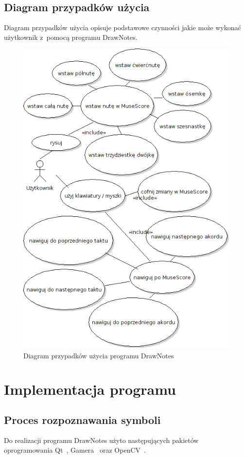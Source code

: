 \documentclass[polish,thesis,12pt]{dcsbook}
\begin{document}
\newpage
\section{Diagram przypadków użycia}
Diagram przypadków użycia opisuje podstawowe czynności jakie może wykonać użytkownik z~pomocą programu DrawNotes.
\begin{figure}[H]
  \centering
  \includegraphics[scale=0.75,bb=0 0 505 735]{img/UC.png}
  \caption{Diagram przypadków użycia programu DrawNotes}
  \label{uc}
\end{figure}

\chapter{Implementacja programu}
\section{Proces rozpoznawania symboli}
Do realizacji programu DrawNotes użyto następujących pakietów oprogramowania Qt~\cite{Qt}, Gamera~\cite{Gamera} oraz OpenCV~\cite{OpenCV}.
\end{document}
